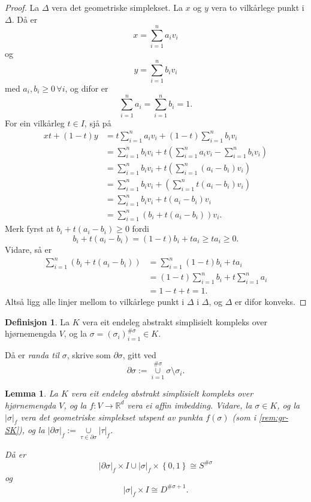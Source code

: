\documentclass[a4paper, 12pt, norsk]{article}
\theoremstyle{plain}
\newtheorem{lemma}[theorem]{Lemma}
\theoremstyle{definition}
\newtheorem{definition}[theorem]{Definisjon}
\newcommand{\Rb}{\mathbb{R}}
\newcommand{\union}{ \mathop{\cup}\limits }
\newcommand{\gr}[1]{ \lvert #1 \rvert } %
\newcommand{\set}[1]{ \left\{ #1 \right\} } %
\newcommand{\tuple}[1]{ \left( #1 \right) } %
\begin{document}
\begin{proof}
	La \( \Delta \) vera det geometriske simplekset. La \( x \) og  \( y \) vera to vilkårlege punkt i \( \Delta \). Då er
	\[
		x = \sum_{i=1}^n a_i v_i
	\]
	og
	\[
		y = \sum_{i=1}^n b_i v_i
	\]
	med \( a_i, b_i \geq 0 \, \forall i \), og difor er
	\[
		\sum_{i=1}^n a_i = \sum_{i=1}^n b_i = 1.
	\]
	For ein vilkårleg \( t \in I \), sjå på
	\begin{align*}
		xt + (1-t)y &= t \sum_{i=1}^n a_i v_i + (1-t)\sum_{i=1}^n b_i v_i \\
		&= \sum_{i=1}^n b_i v_i +t\tuple{\sum_{i=1}^n a_i v_i-\sum_{i=1}^n b_i v_i} \\
		&= \sum_{i=1}^n b_i v_i +t\tuple{\sum_{i=1}^n (a_i-b_i) v_i} \\
		&= \sum_{i=1}^n b_i v_i +\tuple{\sum_{i=1}^n t(a_i-b_i) v_i} \\
		&= \sum_{i=1}^n b_i v_i +t(a_i-b_i) v_i \\
		&= \sum_{i=1}^n (b_i+t(a_i-b_i)) v_i.
	\end{align*}
	Merk fyrst at \( b_i+t(a_i-b_i) \geq 0 \) fordi 
	\[ 
		b_i+t(a_i-b_i) = (1-t)b_i+ta_i \geq ta_i \geq 0.
	\]
	Vidare, så er
	\begin{align*}
		\sum_{i=1}^n (b_i+t(a_i-b_i)) &= \sum_{i=1}^n (1-t)b_i+ta_i \\
		&= (1-t)\sum_{i=1}^n b_i + t \sum_{i=1}^n a_i \\
		&= 1 - t + t = 1.
	\end{align*}
	Altså ligg alle linjer mellom to vilkårlege punkt i \( \Delta \) i \( \Delta \), og \( \Delta \) er difor konveks.
\end{proof}

\begin{definition}
	La \( K \) vera eit endeleg abstrakt simplisielt kompleks over hjørnemengda \( V \), og la \( \sigma = \tuple{\sigma_i}_{i=1}^{\#\sigma} \in K \). 
	
	Då er \emph{randa til \( \sigma \)}, skrive som \( \partial\sigma \), gitt ved
	\[
		\partial\sigma := \union_{i = 1}^{\#\sigma} \sigma \setminus \sigma_i.
	\]
\end{definition}

\begin{lemma} \label{thm:utvida-funk}
	La \( K \) vera eit endeleg abstrakt simplisielt kompleks over hjørnemengda \( V \), og la \( f: V \to \Rb^d \) vera ei affin imbedding. Vidare, la \( \sigma \in K \), og la \( \gr{\sigma}_f \) vera det geometriske simplekset utspent av punkta \( f(\sigma) \) (som i \autoref{rem:gr-SK}), og la \( \gr{\partial\sigma}_f := \union_{\tau \in \partial\sigma} \gr{\tau}_f \). 
	
	Då er
	\[
		\gr{\partial\sigma}_f \times I \union \gr{\sigma}_f \times \set{0, 1} \cong S^{\#\sigma}
	\]
	og
	\[
		\gr{\sigma}_f \times I \cong D^{\#\sigma+1}.
	\] 
\end{lemma}
\end{document}

